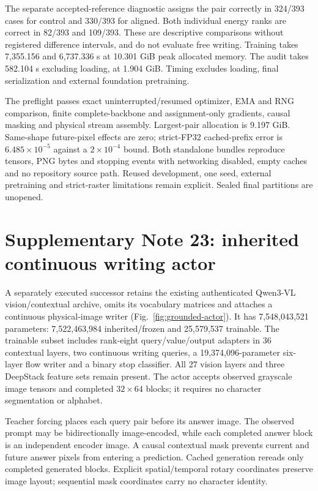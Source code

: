 \documentclass[10pt,a4paper]{article}
\begin{document}
The separate accepted-reference diagnostic assigns the pair correctly in
324/393 cases for control and 330/393 for aligned. Both individual energy
ranks are correct in 82/393 and 109/393. These are descriptive comparisons
without registered difference intervals, and do not evaluate free writing.
Training takes 7,355.156 and 6,737.336 s at 10.301 GiB peak allocated memory.
The audit takes 582.104 s excluding loading, at 1.904 GiB. Timing excludes
loading, final serialization and external foundation pretraining.

The preflight passes exact uninterrupted/resumed optimizer, EMA and RNG
comparison, finite complete-backbone and assignment-only gradients, causal
masking and physical stream assembly. Largest-pair allocation is 9.197 GiB.
Same-shape future-pixel effects are zero; strict-FP32 cached-prefix error is
$6.485\times10^{-5}$ against a $2\times10^{-4}$ bound. Both standalone bundles
reproduce tensors, PNG bytes and stopping events with networking disabled,
empty caches and no repository source path. Reused development, one seed,
external pretraining and strict-raster limitations remain explicit. Sealed
final partitions are unopened.

\section*{Supplementary Note 23: inherited continuous writing actor}
A separately executed successor retains the existing authenticated Qwen3-VL
vision/contextual archive\cite{qwen3vl}, omits its vocabulary matrices and
attaches a continuous physical-image writer (Fig.~\ref{fig:grounded-actor}).
It has 7,548,043,521 parameters: 7,522,463,984 inherited/frozen and 25,579,537
trainable. The trainable subset includes rank-eight query/value/output
adapters in 36 contextual layers, two continuous writing queries, a
19,374,096-parameter six-layer flow writer and a binary stop classifier.
All 27 vision layers and three DeepStack feature sets remain present.
The actor accepts observed grayscale image tensors and completed
$32\times64$ blocks; it requires no character segmentation or alphabet.

Teacher forcing places each query pair before its answer image. The observed
prompt may be bidirectionally image-encoded, while each completed answer block
is an independent encoder image. A causal contextual mask prevents current
and future answer pixels from entering a prediction. Cached generation
rereads only completed generated blocks. Explicit spatial/temporal rotary
coordinates preserve image layout; sequential mask coordinates carry no
character identity.
\end{document}
